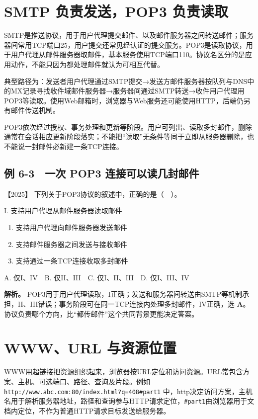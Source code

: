 \section{SMTP 负责发送，POP3 负责读取}\label{cn-06-06}

SMTP是推送协议，用于用户代理提交邮件、以及邮件服务器之间转送邮件；服务器间常用TCP端口25，用户提交还常见经认证的提交服务。POP3是读取协议，用于用户代理从邮件服务器取邮件，基本服务使用TCP端口110。协议名区分的是应用动作，不能只因为都处理邮件就认为可相互代替。

典型路径为：发送者用户代理通过SMTP提交→发送方邮件服务器按队列与DNS中的MX记录寻找收件域邮件服务器→服务器间通过SMTP转送→收件用户代理用POP3等读取。使用Web邮箱时，浏览器与Web服务还可能使用HTTP，后端仍另有邮件传送机制。

POP3依次经过授权、事务处理和更新等阶段。用户可列出、读取多封邮件，删除通常在会话相应更新阶段落实；不能把``读取''无条件等同于立即从服务器删除，也不能说一封邮件必新建一条TCP连接。

\subsection{例 6-3　一次 POP3 连接可以读几封邮件}\label{cn-ex6-3}

\noindent{}【2025】 下列关于POP3协议的叙述中，正确的是（　）。

I. 支持用户代理从邮件服务器读取邮件

\begin{enumerate}
\def\labelenumi{\Roman{enumi}.}
\setcounter{enumi}{1}
\item
  支持用户代理向邮件服务器发送邮件
\item
  支持邮件服务器之间发送与接收邮件
\item
  支持通过一条TCP连接收取多封邮件
\end{enumerate}

A. 仅I、IV　B. 仅II、III　C. 仅I、II、III　D. 仅I、III、IV


\textbf{解析。} POP3用于用户代理读取，I正确；发送和服务器间转送由SMTP等机制承担，II、III错误；事务阶段可在同一TCP连接内处理多封邮件，IV正确，选 \textbf{A}。协议负责哪个方向，比``都传邮件''这个共同背景更能决定答案。

\section{WWW、URL 与资源位置}\label{cn-06-07}

WWW用超链接把资源组织起来，浏览器按URL定位和访问资源。URL常包含方案、主机、可选端口、路径、查询及片段。例如 \allowbreak{}\texttt{http://www.abc.com:80/index.html?q=408\#part1} 中，http决定访问方案，主机名用于解析服务器地址，路径和查询参与HTTP请求定位，\allowbreak{}\texttt{\#part1}由浏览器用于文档内定位，不作为普通HTTP请求目标发送给服务器。

